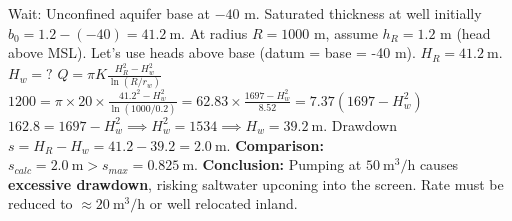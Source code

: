 \documentclass[11pt]{article}
\begin{document}
\begin{exoresolu}
\begin{enumerate}
    Wait: Unconfined aquifer base at $-40$ m. Saturated thickness at well initially $b_0 = 1.2 - (-40) = 41.2\ \mathrm{m}$.
    At radius $R=1000$ m, assume $h_R = 1.2$ m (head above MSL).
    Let's use heads above base (datum = base = -40 m).
    $H_R = 41.2\ \mathrm{m}$. $H_w = ?$
    $Q = \pi K \frac{H_R^2 - H_w^2}{\ln(R/r_w)}$
    $1200 = \pi \times 20 \times \frac{41.2^2 - H_w^2}{\ln(1000/0.2)} = 62.83 \times \frac{1697 - H_w^2}{8.52} = 7.37 (1697 - H_w^2)$
    $162.8 = 1697 - H_w^2 \implies H_w^2 = 1534 \implies H_w = 39.2\ \mathrm{m}$.
    Drawdown $s = H_R - H_w = 41.2 - 39.2 = \mathbf{2.0\ \mathrm{m}}$.
    \textbf{Comparison:} $s_{calc} = 2.0\ \mathrm{m} > s_{max} = 0.825\ \mathrm{m}$.
    \textbf{Conclusion:} Pumping at $50\ \mathrm{m^3/h}$ causes \textbf{excessive drawdown}, risking saltwater upconing into the screen. Rate must be reduced to $\approx 20\ \mathrm{m^3/h}$ or well relocated inland.
\end{enumerate}
\end{exoresolu}
\end{document}

